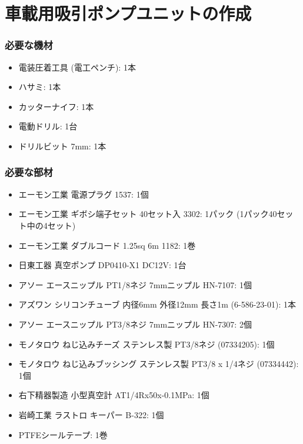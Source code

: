 \documentclass[titlepage,10pt,a4paper,uplatex]{jsbook}
\begin{document}
\section{車載用吸引ポンプユニットの作成}\label{makingpumpunit}

\subsubsection{必要な機材}
\begin{itemize}
\item 電装圧着工具 (電工ペンチ): 1本
\item ハサミ: 1本
\item カッターナイフ: 1本
\item 電動ドリル: 1台
\item ドリルビット 7mm: 1本
\end{itemize}

\subsubsection{必要な部材}
\begin{itemize}
\item エーモン工業 電源プラグ 1537: 1個
\item エーモン工業 ギボシ端子セット 40セット入 3302: 1パック (1パック40セット中の4セット)
\item エーモン工業 ダブルコード 1.25sq 6m 1182: 1巻
\item 日東工器 真空ポンプ DP0410-X1 DC12V: 1台
\item アソー エースニップル PT1/8ネジ 7mmニップル HN-7107: 1個
\item アズワン シリコンチューブ 内径6mm 外径12mm 長さ1m (6-586-23-01): 1本
\item アソー エースニップル PT3/8ネジ 7mmニップル HN-7307: 2個
\item モノタロウ ねじ込みチーズ ステンレス製 PT3/8ネジ (07334205): 1個
\item モノタロウ ねじ込みブッシング ステンレス製 PT3/8 x 1/4ネジ (07334442): 1個
\item 右下精器製造 小型真空計 AT1/4Rx50x-0.1MPa: 1個
\item 岩崎工業 ラストロ キーパー B-322: 1個
\item PTFEシールテープ: 1巻
\end{itemize}
\end{document}
